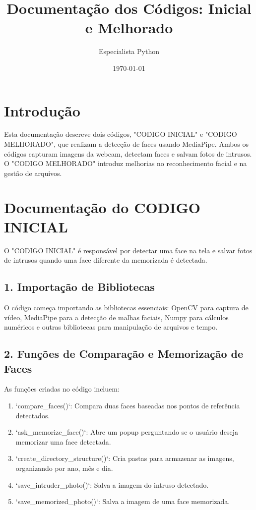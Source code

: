 \documentclass{article}%
\title{Documentação dos Códigos: Inicial e Melhorado}%
\author{Especialista Python}%
\date{\today}%
\begin{document}
%
\normalsize%
\maketitle%
\section{Introdução}%
\label{sec:Introduo}%
Esta documentação descreve dois códigos, "CODIGO INICIAL" e "CODIGO MELHORADO", que realizam a detecção de faces usando MediaPipe. Ambos os códigos capturam imagens da webcam, detectam faces e salvam fotos de intrusos. O "CODIGO MELHORADO" introduz melhorias no reconhecimento facial e na gestão de arquivos.

%
\section{Documentação do CODIGO INICIAL}%
\label{sec:DocumentaodoCODIGOINICIAL}%
O "CODIGO INICIAL" é responsável por detectar uma face na tela e salvar fotos de intrusos quando uma face diferente da memorizada é detectada.%
\subsection{1. Importação de Bibliotecas}%
\label{subsec:1.ImportaodeBibliotecas}%
O código começa importando as bibliotecas essenciais: OpenCV para captura de vídeo, MediaPipe para a detecção de malhas faciais, Numpy para cálculos numéricos e outras bibliotecas para manipulação de arquivos e tempo.

%
\subsection{2. Funções de Comparação e Memorização de Faces}%
\label{subsec:2.FunesdeComparaoeMemorizaodeFaces}%
As funções criadas no código incluem:%
\begin{enumerate}%
\item%
`compare\_faces()`: Compara duas faces baseadas nos pontos de referência detectados.%
\item%
`ask\_memorize\_face()`: Abre um popup perguntando se o usuário deseja memorizar uma face detectada.%
\item%
`create\_directory\_structure()`: Cria pastas para armazenar as imagens, organizando por ano, mês e dia.%
\item%
`save\_intruder\_photo()`: Salva a imagem do intruso detectado.%
\item%
`save\_memorized\_photo()`: Salva a imagem de uma face memorizada.%
\end{enumerate}
\end{document}
